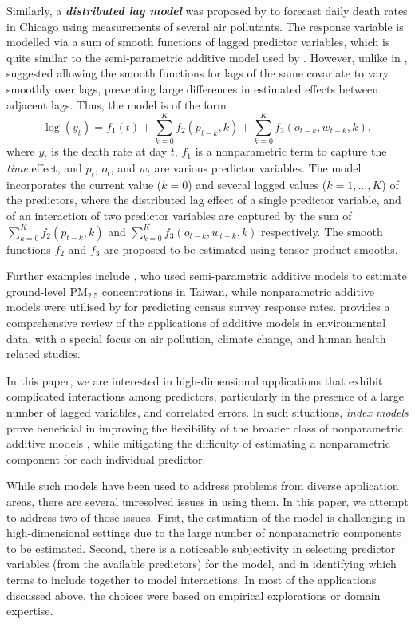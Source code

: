 \documentclass[
  11pt,
  a4paper,
]{article}
\begin{document}
Similarly, a \textbf{\emph{distributed lag model}} was proposed by
\textcite{Wood2017} to forecast daily death rates in Chicago using
measurements of several air pollutants. The response variable is
modelled via a sum of smooth functions of lagged predictor variables,
which is quite similar to the semi-parametric additive model used by
\textcite{FH2012}. However, unlike in \textcite{FH2012},
\textcite{Wood2017} suggested allowing the smooth functions for lags of
the same covariate to vary smoothly over lags, preventing large
differences in estimated effects between adjacent lags. Thus, the model
is of the form \[
 \log(y_{t}) = f_{1}(t) + \sum_{k=0}^{K} f_{2}(p_{t-k}, k) + \sum_{k=0}^{K} f_{3}(o_{t-k}, w_{t-k}, k),
\] where \(y_{t}\) is the death rate at day \(t\), \(f_{1}\) is a
nonparametric term to capture the \emph{time} effect, and \(p_t\),
\(o_t\), and \(w_t\) are various predictor variables. The model
incorporates the current value (\(k = 0\)) and several lagged values
(\(k = 1, \dots, K\)) of the predictors, where the distributed lag
effect of a single predictor variable, and of an interaction of two
predictor variables are captured by the sum of
\(\sum_{k=0}^{K} f_{2}(p_{t-k}, k)\) and
\(\sum_{k=0}^{K} f_{3}(o_{t-k}, w_{t-k}, k)\) respectively. The smooth
functions \(f_{2}\) and \(f_{3}\) are proposed to be estimated using
tensor product smooths.

Further examples include \textcite{Ho2020}, who used semi-parametric
additive models to estimate ground-level \(\text{PM}_{2.5}\)
concentrations in Taiwan, while nonparametric additive models were
utilised by \textcite{Ibrahim2021} for predicting census survey response
rates. \textcite{Ravindra2019} provides a comprehensive review of the
applications of additive models in environmental data, with a special
focus on air pollution, climate change, and human health related
studies.

In this paper, we are interested in high-dimensional applications that
exhibit complicated interactions among predictors, particularly in the
presence of a large number of lagged variables, and correlated errors.
In such situations, \emph{index models} prove beneficial in improving
the flexibility of the broader class of nonparametric additive models
\autocite{Radchenko2015}, while mitigating the difficulty of estimating
a nonparametric component for each individual predictor.

While such models have been used to address problems from diverse
application areas, there are several unresolved issues in using them. In
this paper, we attempt to address two of those issues. First, the
estimation of the model is challenging in high-dimensional settings due
to the large number of nonparametric components to be estimated. Second,
there is a noticeable subjectivity in selecting predictor variables
(from the available predictors) for the model, and in identifying which
terms to include together to model interactions. In most of the
applications discussed above, the choices were based on empirical
explorations or domain expertise.
\end{document}
